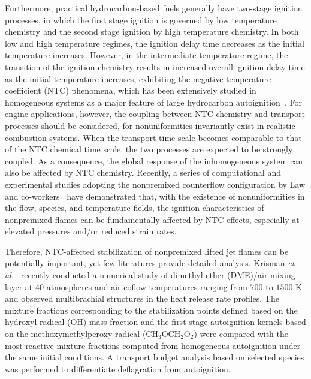 \documentclass[review,3p,times]{elsarticle}
\begin{document}
Furthermore, practical hydrocarbon-based fuels generally have two-stage ignition processes, in which the first stage ignition is governed by low temperature chemistry and the second stage ignition by high temperature chemistry.  In both low and high temperature regimes, the ignition delay time decreases as the initial temperature increases.  However, in the intermediate temperature regime, the transition of the ignition chemistry results in increased overall ignition delay time as the initial temperature increases, exhibiting the negative temperature coefficient (NTC) phenomena, which has been extensively studied in homogeneous systems as a major feature of large hydrocarbon autoignition~\cite{zador11}.  For engine applications, however, the coupling between NTC chemistry and transport processes should be considered, for nonuniformities invariantly exist in realistic combustion systems.  When the transport time scale becomes comparable to that of the NTC chemical time scale, the two processes are expected to be strongly coupled.  As a consequence, the global response of the inhomogeneous system can also be affected by NTC chemistry.  Recently, a series of computational and experimental studies adopting the nonpremixed counterflow configuration by Law and co-workers~\cite{law12,zhao13,deng14} have demonstrated that, with the existence of nonuniformities in the flow, species, and temperature fields, the ignition characteristics of nonpremixed flames can be fundamentally affected by NTC effects, especially at elevated pressures and/or reduced strain rates.   

Therefore, NTC-affected stabilization of nonpremixed lifted jet flames can be potentially important, yet few literatures provide detailed analysis.  Krisman \emph{et al.}~\cite{krisman14} recently conducted a numerical study of dimethyl ether (DME)/air mixing layer at $40$ atmospheres and air coflow temperatures ranging from $700$ to $1500$ K and observed multibrachial structures in the heat release rate profiles.  The mixture fractions corresponding to the stabilization points defined based on the hydroxyl radical (OH) mass fraction and the first stage autoignition kernels based on the methoxymethylperoxy radical (CH$_3$OCH$_2$O$_2$) were compared with the most reactive mixture fractions computed from homogeneous autoignition under the same initial conditions.  A transport budget analysis based on selected species was performed to differentiate deflagration from autoignition.
\end{document}

